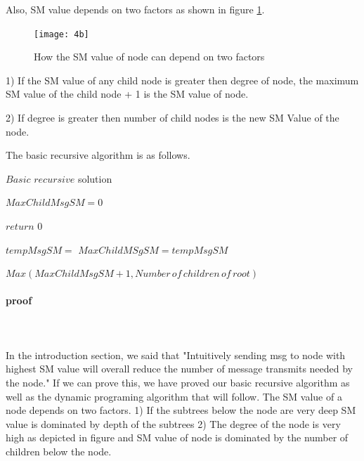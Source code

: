 Also, SM value depends on two factors as shown in figure \ref{fig:4b}. 

\begin{figure}[4b]
    \centering
    \texttt{[image: 4b]}
    \caption{How the SM value of node can depend on two factors}
    \label{fig:4b}
\end{figure}




1) If the SM value of any child node is greater then degree of node, the maximum SM value of the child node  + 1 is the SM value of node.

2) If degree is greater then number of child nodes is the new SM Value of the node. 

The basic recursive algorithm is as follows. 


\begin{algorithm}
	\caption{$Basic $ $recursive $ solution}
	\begin{algorithmic}
		\State $ MaxChildMsgSM = 0 $
		
			\State $ return$ $ 0$ 	
		\EndIf
	  	\State 		
		
		\State $tempMsgSM =$  
			\State $MaxChildMSgSM = tempMsgSM$
		\EndIf
		\EndFor
		
		\Return $ Max(MaxChildMsgSM + 1, Number \, of \, children \, of \, root) $
			 
	  \EndFunction
	
	  
	\end{algorithmic}
\end{algorithm}


\paragraph{proof} \\
\\
In the introduction section, we said that "Intuitively sending msg to node with highest SM value will overall reduce the number of message transmits needed by the node." If we can prove this, we have proved our basic recursive algorithm as well as the dynamic programing algorithm that will follow. The SM value of a node depends on two factors. 1) If the subtrees below the node are very deep SM value is dominated by depth of the subtrees 2) The degree of the node is very high as depicted in figure and SM value of node is dominated by the number of children below the node. 

